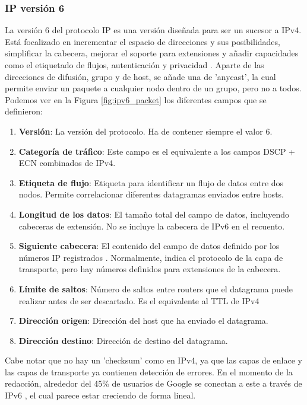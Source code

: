 \subsubsection{IP versión 6}

La versión 6 del protocolo IP es una versión diseñada para ser un sucesor a IPv4. Está focalizado en incrementar el espacio de direcciones y sus posibilidades, simplificar la cabecera, mejorar el soporte para extensiones y añadir capacidades como el etiquetado de flujos, autenticación y privacidad \cite{rfc8200}. Aparte de las direcciones de difusión, grupo y de host, se añade una de 'anycast', la cual permite enviar un paquete a cualquier nodo dentro de un grupo, pero no a todos. Podemos ver en la Figura \ref{fig:ipv6_packet} los diferentes campos que se definieron:

\begin{enumerate}
    \item \textbf{Versión}: La versión del protocolo. Ha de contener siempre el valor 6.
    \item \textbf{Categoría de tráfico}: Este campo es el equivalente a los campos DSCP + ECN combinados de IPv4.
    \item \textbf{Etiqueta de flujo}: Etiqueta para identificar un flujo de datos entre dos nodos. Permite correlacionar diferentes datagramas enviados entre hosts.
    \item \textbf{Longitud de los datos}: El tamaño total del campo de datos, incluyendo cabeceras de extensión. No se incluye la cabecera de IPv6 en el recuento.
    \item \textbf{Siguiente cabecera}: El contenido del campo de datos definido por los números IP registrados \cite{ipprotocolnumbers}. Normalmente, indica el protocolo de la capa de transporte, pero hay números definidos para extensiones de la cabecera.
    \item \textbf{Límite de saltos}: Número de saltos entre routers que el datagrama puede realizar antes de ser descartado. Es el equivalente al TTL de IPv4
    \item \textbf{Dirección origen}: Dirección del host que ha enviado el datagrama.
    \item \textbf{Dirección destino}: Dirección de destino del datagrama.
\end{enumerate}

Cabe notar que no hay un 'checksum' como en IPv4, ya que las capas de enlace y las capas de transporte ya contienen detección de errores. En el momento de la redacción, alrededor del 45\% de usuarios de Google se conectan a este a través de IPv6 \cite{ipv4ipv6usage}, el cual parece estar creciendo de forma lineal.

